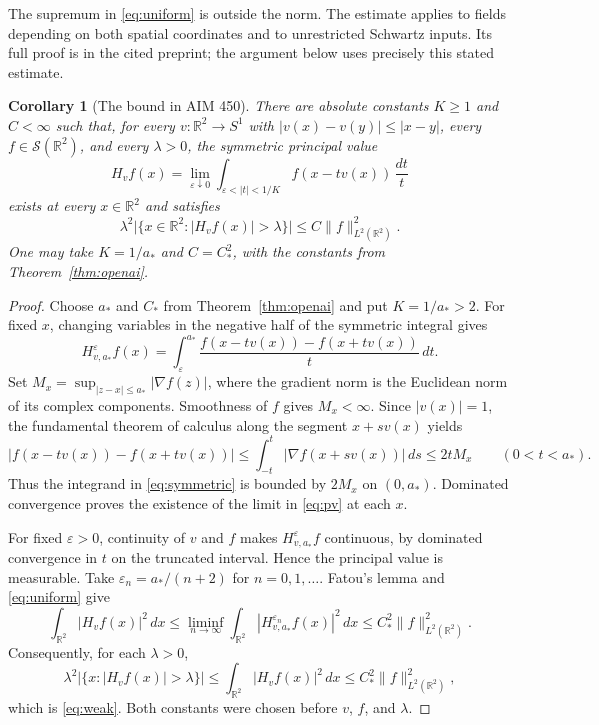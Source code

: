 \documentclass[11pt]{article}
\newtheorem{corollary}[theorem]{Corollary}
\newcommand{\R}{\mathbb R}
\newcommand{\Schwartz}{\mathcal S}
\begin{document}
The supremum in \eqref{eq:uniform} is outside the norm. The estimate
applies to fields depending on both spatial coordinates and to unrestricted
Schwartz inputs. Its full proof is in the cited preprint; the argument below
uses precisely this stated estimate.

\begin{corollary}[The bound in AIM 450]\label{cor:aim}
There are absolute constants $K\ge1$ and $C<\infty$ such that, for every
$v\colon\R^2\to S^1$ with $|v(x)-v(y)|\le|x-y|$, every
$f\in\Schwartz(\R^2)$, and every $\lambda>0$, the symmetric principal value
\begin{equation}\label{eq:pv}
 H_vf(x)=\lim_{\varepsilon\downarrow0}
 \int_{\varepsilon<|t|<1/K}f(x-tv(x))\,\frac{dt}{t}
\end{equation}
exists at every $x\in\R^2$ and satisfies
\begin{equation}\label{eq:weak}
 \lambda^2\bigl|\{x\in\R^2:|H_vf(x)|>\lambda\}\bigr|
 \le C\|f\|_{L^2(\R^2)}^2.
\end{equation}
One may take $K=1/a_*$ and $C=C_*^2$, with the constants from
Theorem~\ref{thm:openai}.
\end{corollary}

\begin{proof}
Choose $a_*$ and $C_*$ from Theorem~\ref{thm:openai} and put
$K=1/a_*>2$. For fixed $x$, changing variables in the negative half of the
symmetric integral gives
\begin{equation}\label{eq:symmetric}
 H^{\varepsilon}_{v,a_*}f(x)
 =\int_{\varepsilon}^{a_*}
 \frac{f(x-tv(x))-f(x+tv(x))}{t}\,dt.
\end{equation}
Set $M_x=\sup_{|z-x|\le a_*}|\nabla f(z)|$, where the gradient norm is
the Euclidean norm of its complex components. Smoothness of $f$ gives
$M_x<\infty$. Since $|v(x)|=1$, the fundamental theorem of calculus along
the segment $x+s v(x)$ yields
\[
 |f(x-tv(x))-f(x+tv(x))|
 \le \int_{-t}^{t}|\nabla f(x+s v(x))|\,ds
 \le 2t M_x\qquad(0<t<a_*).
\]
Thus the integrand in \eqref{eq:symmetric} is bounded by $2M_x$ on
$(0,a_*)$. Dominated convergence proves the existence of the limit in
\eqref{eq:pv} at each $x$.

For fixed $\varepsilon>0$, continuity of $v$ and $f$ makes
$H^{\varepsilon}_{v,a_*}f$ continuous, by dominated convergence in $t$ on
the truncated interval. Hence the principal value is measurable.
Take $\varepsilon_n=a_* /(n+2)$ for $n=0,1,\ldots$. Fatou's lemma and
\eqref{eq:uniform} give
\[
 \int_{\R^2}|H_vf(x)|^2\,dx
 \le \liminf_{n\to\infty}
       \int_{\R^2}|H^{\varepsilon_n}_{v,a_*}f(x)|^2\,dx
 \le C_*^2\|f\|_{L^2(\R^2)}^2.
\]
Consequently, for each $\lambda>0$,
\[
 \lambda^2|\{x:|H_vf(x)|>\lambda\}|
 \le \int_{\R^2}|H_vf(x)|^2\,dx
 \le C_*^2\|f\|_{L^2(\R^2)}^2,
\]
which is \eqref{eq:weak}. Both constants were chosen before $v$, $f$,
and $\lambda$.
\end{proof}
\end{document}
